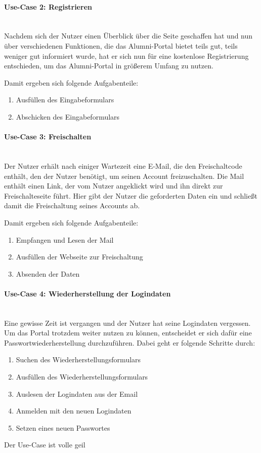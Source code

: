 \paragraph{Use-Case 2: Registrieren}\quad\\
Nachdem sich der Nutzer einen Überblick über die Seite geschaffen hat und nun über verschiedenen Funktionen, die das Alumni-Portal bietet teils gut, teils weniger gut informiert wurde, hat er sich nun für eine kostenlose Registrierung entschieden, um das Alumni-Portal in größerem Umfang zu nutzen.

Damit ergeben sich folgende Aufgabenteile:
\begin{enumerate}
		\item Ausfüllen des Eingabeformulars
		\item Abschicken des Eingabeformulars
\end{enumerate}

\paragraph{Use-Case 3: Freischalten}\quad\\
Der Nutzer erhält nach einiger Wartezeit eine E\hbox{-}Mail, die den Freischaltcode enthält, den der Nutzer benötigt, um seinen Account freizuschalten. Die Mail enthält einen Link, der vom Nutzer angeklickt wird und ihn direkt zur Freischalteseite führt. Hier gibt der Nutzer die geforderten Daten ein und schließt damit die Freischaltung seines Accounts ab.

Damit ergeben sich folgende Aufgabenteile:
\begin{enumerate}
		\item Empfangen und Lesen der Mail
		\item Ausfüllen der Webseite zur Freischaltung
		\item Absenden der Daten
\end{enumerate}


\paragraph{Use-Case 4: Wiederherstellung der Logindaten}\quad\\
Eine gewisse Zeit ist vergangen und der Nutzer hat seine Logindaten vergessen. Um das Portal trotzdem weiter nutzen zu können, entscheidet er sich dafür eine Passwortwiederherstellung durchzuführen. 
Dabei geht er folgende Schritte durch:
\begin{enumerate}
\item Suchen des Wiederherstellungsformulars
\item Ausfüllen des Wiederherstellungsformulars
\item Auslesen der Logindaten aus der Email
\item Anmelden mit den neuen Logindaten
\item Setzen eines neuen Passwortes
\end{enumerate}
Der Use-Case ist volle geil


